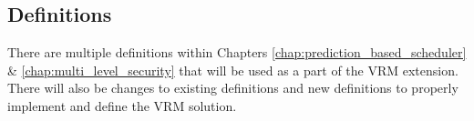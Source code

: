 \subsection{Definitions}
\label{rep:definitions}

There are multiple definitions within Chapters \ref{chap:prediction_based_scheduler} \& \ref{chap:multi_level_security} that will be used as a part of the VRM extension. There will also be changes to existing definitions and new definitions to properly implement and define the VRM solution.